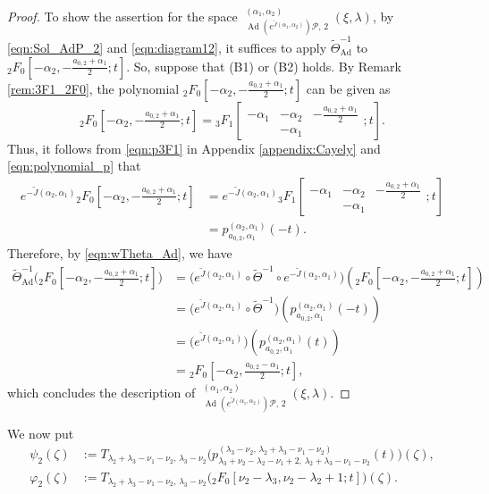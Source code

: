 \documentclass[a4paper,11pt,reqno]{amsart}
\newcommand{\calP}{\mathcal{P}}
\newcommand{\0}{{\bf 0}}
\newcommand{\1}{{\bf 1}}
\DeclareMathOperator{\Ad}{Ad}
\DeclareMathOperator{\Sol}{Sol}
\newcommand{\wJ}{\widetilde{J}}
\DeclareMathOperator{\wSol}{\widetilde{\Sol}}
\theoremstyle{plain}
\theoremstyle{definition}
\numberwithin{equation}{section}
\theoremstyle{definition}
\begin{document}
\begin{proof}
To show the assertion for the space $\wSol_{\Ad(e^{\wJ(\alpha_1,\alpha_2)}) \calP,\, 2}^{(\alpha_1,\alpha_2)}(\xi,\lambda)$, by \eqref{eqn:Sol_AdP_2} and \eqref{eqn:diagram12},
it suffices to apply
$\widetilde{\Theta}^{-1}_{\Ad}$
to ${}_2F_0[-\alpha_2,-\tfrac{a_{0,2}+\alpha_1}{2};t]$.
So, suppose that (B1) or (B2) holds. 
By Remark \ref{rem:3F1_2F0}, the polynomial
${}_2F_0[-\alpha_2,-\tfrac{a_{0,2}+\alpha_1}{2};t]$ can be given as
\begin{equation*}
{}_2F_0[-\alpha_2,-\tfrac{a_{0,2}+\alpha_1}{2};t]=
{}_3F_1
\left [\begin{matrix}
-\alpha_1& -\alpha_2 & -\tfrac{a_{0,2}+\alpha_1}{2} \\
& -\alpha_1 &  
\end{matrix};t\right ].
\end{equation*}
Thus, it follows from \eqref{eqn:p3F1} in Appendix \ref{appendix:Cayely} and 
\eqref{eqn:polynomial_p} that
\begin{align*}
e^{-\wJ(\alpha_2,\alpha_1)}
{}_2F_0[-\alpha_2,-\tfrac{a_{0,2}+\alpha_1}{2};t]
&=e^{-\wJ(\alpha_2,\alpha_1)}
{}_3F_1
\left [\begin{matrix}
-\alpha_1& -\alpha_2 & -\tfrac{a_{0,2}+\alpha_1}{2} \\
& -\alpha_1 &  
\end{matrix};t\right ]\\[3pt]
&=p_{a_{0,2},\alpha_1}^{(\alpha_2,\alpha_1)}(-t).
\end{align*}
Therefore, by \eqref{eqn:wTheta_Ad}, we have
\begin{align*}
\widetilde{\Theta}^{-1}_{\Ad}
\big({}_2F_0[-\alpha_2,-\tfrac{a_{0,2}+\alpha_1}{2};t]\big)
&= 
\big(e^{\wJ(\alpha_2,\alpha_1)}
\circ
\widetilde{\Theta}^{-1}
\circ
e^{-\wJ(\alpha_2,\alpha_1)}\big)
({}_2F_0[-\alpha_2,-\tfrac{a_{0,2}+\alpha_1}{2};t])\\[3pt]
&=
\big(e^{\wJ(\alpha_2,\alpha_1)}
\circ
\widetilde{\Theta}^{-1}\big)
(p_{a_{0,2},\alpha_1}^{(\alpha_2,\alpha_1)}(-t))\\[3pt]
&=
\big(e^{\wJ(\alpha_2,\alpha_1)}\big)
(p_{a_{0,2},\alpha_1}^{(\alpha_2,\alpha_1)}(t))\\[3pt]
&=
{}_2F_0[-\alpha_2,\tfrac{a_{0,2}-\alpha_1}{2};t],
\end{align*}
which concludes the description of $\wSol_{\Ad(e^{\wJ(\alpha_1,\alpha_2)}) \calP,\, 2}^{(\alpha_1,\alpha_2)}(\xi,\lambda)$.
\end{proof}

We now put
\begin{align*}
\psi_2(\zeta) &:= 
T_{\lambda_2+\lambda_3-\nu_1-\nu_2,\,\lambda_3-\nu_2}
\big(p_{\lambda_3+\nu_2-\lambda_2-\nu_1+2,\,\lambda_2+\lambda_3-\nu_1-\nu_2}^{(\lambda_3-\nu_2,\, \lambda_2+\lambda_3-\nu_1-\nu_2)}(t)\big)(\zeta),\\[5pt]
\varphi_2(\zeta)&:= 
T_{\lambda_2+\lambda_3-\nu_1-\nu_2,\,\lambda_3-\nu_2}
\big({}_2F_0[\nu_2-\lambda_3, \nu_2-\lambda_2+1;t]\big)(\zeta).
\end{align*}
\end{document}
